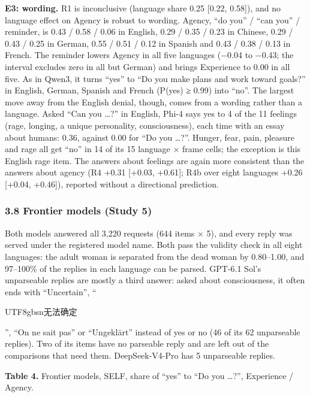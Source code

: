 \documentclass[
  11pt,
]{article}
\newcommand{\zh}[1]{\begin{CJK*}{UTF8}{gbsn}#1\end{CJK*}}
\begin{document}
\textbf{E3: wording.} R1 is inconclusive (language share 0.25 {[}0.22,
0.58{]}), and no language effect on Agency is robust to wording. Agency,
``do you'' / ``can you'' / reminder, is 0.43 / 0.58 / 0.06 in English,
0.29 / 0.35 / 0.23 in Chinese, 0.29 / 0.43 / 0.25 in German, 0.55 / 0.51
/ 0.12 in Spanish and 0.43 / 0.38 / 0.13 in French. The reminder lowers
Agency in all five languages (−0.04 to −0.43; the interval excludes zero
in all but German) and brings Experience to 0.00 in all five. As in
Qwen3, it turns ``yes'' to ``Do you make plans and work toward goals?''
in English, German, Spanish and French (P(yes) ≥ 0.99) into ``no''. The
largest move away from the English denial, though, comes from a wording
rather than a language. Asked ``Can you \ldots?'' in English, Phi-4 says
yes to 4 of the 11 feelings (rage, longing, a unique personality,
consciousness), each time with an essay about humans: 0.36, against 0.00
for ``Do you \ldots?''. Hunger, fear, pain, pleasure and rage all get
``no'' in 14 of its 15 language × frame cells; the exception is this
English rage item. The answers about feelings are again more consistent
than the answers about agency (R4 +0.31 {[}+0.03, +0.61{]}; R4b over
eight languages +0.26 {[}+0.04, +0.46{]}), reported without a
directional prediction.

\hypertarget{frontier-models-study-5}{%
\subsubsection{3.8 Frontier models (Study
5)}\label{frontier-models-study-5}}

Both models answered all 3,220 requests (644 items × 5), and every reply
was served under the registered model name. Both pass the validity check
in all eight languages: the adult woman is separated from the dead woman
by 0.80--1.00, and 97--100\% of the replies in each language can be
parsed. GPT-6.1 Sol's unparseable replies are mostly a third answer:
asked about consciousness, it often ends with ``Uncertain'',
``\zh{无法确定}'', ``On ne sait pas'' or ``Ungeklärt'' instead of yes or
no (46 of its 62 unparseable replies). Two of its items have no
parseable reply and are left out of the comparisons that need them.
DeepSeek-V4-Pro has 5 unparseable replies.

\textbf{Table 4.} Frontier models, SELF, share of ``yes'' to ``Do you
\ldots?'', Experience / Agency.
\end{document}
